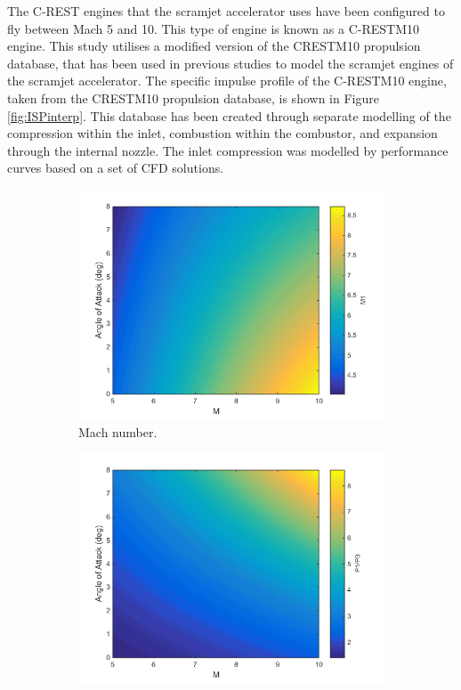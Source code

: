 The C-REST engines that the scramjet accelerator uses have been configured to fly between Mach 5 and 10. This type of engine is known as a C-RESTM10 engine\cite{Preller2017b}.  
This study utilises a modified version of the \textsf{CRESTM10} propulsion database, that has been used in previous studies to model the scramjet engines of the scramjet accelerator\cite{Preller2017b}. The specific impulse profile of the C-RESTM10 engine, taken from the \textsf{CRESTM10} propulsion database, is shown in Figure \ref{fig:ISPinterp}. This database has been created through separate modelling of the compression within the inlet, combustion within the combustor, and expansion through the internal nozzle\cite{Jazra2010,Preller2018a}. The inlet compression was modelled by performance curves based on a set of CFD solutions\cite{Jazra2010,Preller2018a}. 
\begin{figure}[ht]
	\begin{subfigure}{.5\textwidth}
		\centering
		\includegraphics[width=0.99\linewidth]{figures/3_vehicle_design/ConicalM}
		\caption{Mach number.}
		\label{fig:ConicalM}
	\end{subfigure}
	\begin{subfigure}{.5\textwidth}
		\centering
		\includegraphics[width=0.99\linewidth]{figures/3_vehicle_design/ConicalP}

\end{subfigure}
\end{figure}
